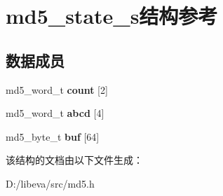\hypertarget{structmd5__state__s}{\section{md5\-\_\-state\-\_\-s结构参考}
\label{structmd5__state__s}
}
\subsection*{数据成员}
\begin{DoxyCompactItemize}
\item 
\hypertarget{structmd5__state__s_a3be6ab1e3c2ff4912461e5ac33613d8e}{md5\-\_\-word\-\_\-t {\bfseries count} \mbox{[}2\mbox{]}}\label{structmd5__state__s_a3be6ab1e3c2ff4912461e5ac33613d8e}

\item 
\hypertarget{structmd5__state__s_ad92f62219e6441e3f7158ddf79756a1c}{md5\-\_\-word\-\_\-t {\bfseries abcd} \mbox{[}4\mbox{]}}\label{structmd5__state__s_ad92f62219e6441e3f7158ddf79756a1c}

\item 
\hypertarget{structmd5__state__s_a67a697f288a837f18d3376518925445e}{md5\-\_\-byte\-\_\-t {\bfseries buf} \mbox{[}64\mbox{]}}\label{structmd5__state__s_a67a697f288a837f18d3376518925445e}

\end{DoxyCompactItemize}


该结构的文档由以下文件生成：\begin{DoxyCompactItemize}
\item 
\-D\-:/libeva/src/md5.\-h\end{DoxyCompactItemize}
